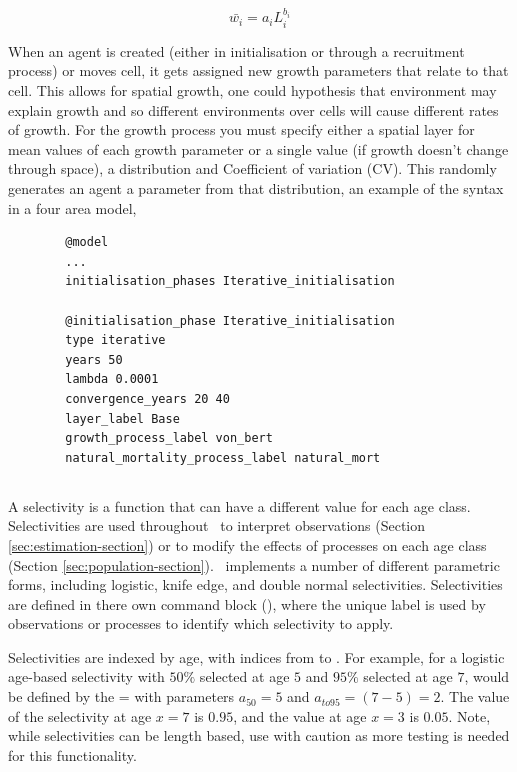 \begin{equation}\label{mean_weight}
\bar{w_i} = a_iL_i^{b_i}
\end{equation}


When an agent is created (either in initialisation or through a recruitment process) or moves cell, it gets assigned new growth parameters that relate to that cell. This allows for spatial growth, one could hypothesis that environment may explain growth and so different environments over cells will cause different rates of growth. For the growth process you must specify either a spatial layer for mean values of each growth parameter or a single value (if growth doesn't change through space), a distribution and Coefficient of variation (CV). This randomly generates an agent a parameter from that distribution, an example of the syntax in a four area model,

{\small{\begin{verbatim}
		@model
		...
		initialisation_phases Iterative_initialisation
		
		@initialisation_phase Iterative_initialisation
		type iterative
		years 50
		lambda 0.0001
		convergence_years 20 40
		layer_label Base
		growth_process_label von_bert
		natural_mortality_process_label natural_mort
\end{verbatim}}}



\subsection{\label{sec:selectivities}}
A selectivity is a function that can have a different value for each age class. Selectivities are used throughout \IBM\ to interpret observations (Section \ref{sec:estimation-section}) or to modify the effects of processes on each age class (Section \ref{sec:population-section}). \IBM\ implements a number of different parametric forms, including logistic, knife edge, and double normal selectivities. Selectivities are defined in there own command block (), where the unique label is used by observations or processes to identify which selectivity to apply.

Selectivities are indexed by age, with indices from  to . For example, for a logistic age-based selectivity with $50\%$ selected at age $5$ and $95\%$ selected at age $7$, would be defined by the = with parameters $a_{50}=5$ and $a_{to95}=(7-5)=2$. The value of the selectivity at age $x=7$ is $0.95$, and the value at age $x=3$ is $0.05$. Note, while selectivities can be length based, use with caution as more testing is needed for this functionality.

